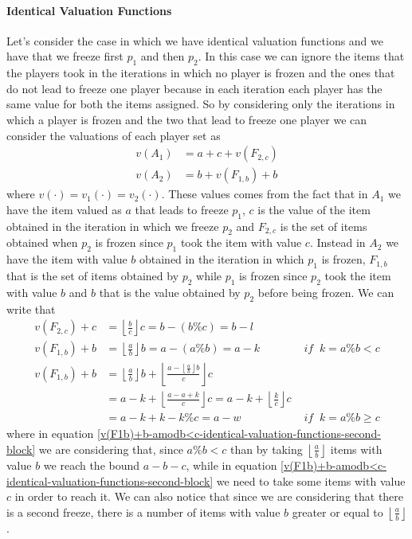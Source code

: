 \paragraph{Identical Valuation Functions}
Let's consider the case in which we have identical valuation functions and we have that we freeze first $p_1$ and then $p_2$. In this case we can ignore the items that the players took in the iterations in which no player is frozen and the ones that do not lead to freeze one player because in each iteration each player has the same value for both the items assigned. So by considering only the iterations in which a player is frozen and the two that lead to freeze one player we can consider the valuations of each player set as 
\begin{align*}
    v(A_1) & = a + c + v(F_{2,c})\\
    v(A_2) & = b + v(F_{1,b}) + b
\end{align*}
where $v(\cdot) = v_1(\cdot) = v_2(\cdot)$. These values comes from the fact that in $A_1$ we have the item valued as $a$ that leads to freeze $p_1$, $c$ is the value of the item obtained in the iteration in which we freeze $p_2$ and $F_{2,c}$ is the set of items obtained when $p_2$ is frozen since $p_1$ took the item with value $c$.
Instead in $A_2$ we have the item with value $b$ obtained in the iteration in which $p_1$ is frozen,
$F_{1,b}$ that is the set of items obtained by $p_2$ while $p_1$ is frozen since $p_2$ took the item with value $b$ and $b$ that is the value obtained by $p_2$ before being frozen.
We can write that 
\begin{align}
    v(F_{2,c}) + c &= \left\lfloor \frac{b}{c}\right\rfloor c = b - (b\% c) = b-l \label{v(F2c)+c-identical-valuation-functions-second-block}\\
    v(F_{1,b}) + b &= \left\lfloor \frac{a}{b}\right\rfloor b = a - (a\% b) = a - k  &\textit{ if } \:k = a\% b < c \label{v(F1b)+b-amodb<c-identical-valuation-functions-second-block}\\
    v(F_{1,b}) + b &=\left\lfloor \frac{a}{b}\right\rfloor b + \left\lfloor \frac{a - \left\lfloor \frac{a}{b}\right\rfloor b }{c}\right \rfloor c \label{v(F1b)+b-amodb>c-identical-valuation-functions-second-block} \\&= a-k + \left\lfloor \frac{a- a + k }{c} \right\rfloor c = a - k + \left\lfloor \frac{k}{c}\right\rfloor c \\&= a - k + k - k\% c  = a - w &\textit{ if } \:k = a\% b \ge c
\end{align}
where in equation \ref{v(F1b)+b-amodb<c-identical-valuation-functions-second-block} we are considering that, since $a\% b < c$ than by taking $\left\lfloor\frac{a}{b}\right\rfloor$ items with value $b$ we reach the bound $a-b-c$, while in equation \ref{v(F1b)+b-amodb<c-identical-valuation-functions-second-block} we need to take some items with value $c$ in order to reach it. We can also notice that since we are considering that there is a second freeze, there is a number of items with value $b$ greater or equal to $\left\lfloor\frac{a}{b}\right\rfloor$. 
